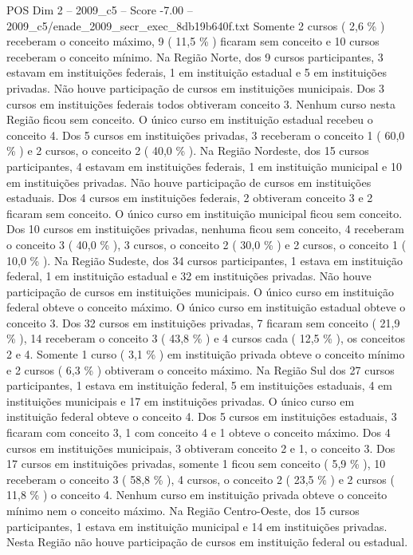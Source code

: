 \begin{textsample}{POS Dim 2 – 2009\_c5 – Score -7.00 – 2009\_c5/enade\_2009\_secr\_exec\_8db19b640f.txt}
Somente 2 cursos ( 2,6 \% ) receberam o conceito máximo, 9 ( 11,5 \% ) ficaram sem conceito e 10 cursos receberam o conceito mínimo.
Na Região Norte, dos 9 cursos participantes, 3 estavam em instituições federais, 1 em instituição estadual e 5 em instituições privadas.
Não houve participação de cursos em instituições municipais.
Dos 3 cursos em instituições federais todos obtiveram conceito 3.
Nenhum curso nesta Região ficou sem conceito.
O único curso em instituição estadual recebeu o conceito 4.
Dos 5 cursos em instituições privadas, 3 receberam o conceito 1 ( 60,0 \% ) e 2 cursos, o conceito 2 ( 40,0 \% ).
Na Região Nordeste, dos 15 cursos participantes, 4 estavam em instituições federais, 1 em instituição municipal e 10 em instituições privadas.
Não houve participação de cursos em instituições estaduais.
Dos 4 cursos em instituições federais, 2 obtiveram conceito 3 e 2 ficaram sem conceito.
O único curso em instituição municipal ficou sem conceito.
Dos 10 cursos em instituições privadas, nenhuma ficou sem conceito, 4 receberam o conceito 3 ( 40,0 \% ), 3 cursos, o conceito 2 ( 30,0 \% ) e 2 cursos, o conceito 1 ( 10,0 \% ).
Na Região Sudeste, dos 34 cursos participantes, 1 estava em instituição federal, 1 em instituição estadual e 32 em instituições privadas.
Não houve participação de cursos em instituições municipais.
O único curso em instituição federal obteve o conceito máximo.
O único curso em instituição estadual obteve o conceito 3.
Dos 32 cursos em instituições privadas, 7 ficaram sem conceito ( 21,9 \% ), 14 receberam o conceito 3 ( 43,8 \% ) e 4 cursos cada ( 12,5 \% ), os conceitos 2 e 4.
Somente 1 curso ( 3,1 \% ) em instituição privada obteve o conceito mínimo e 2 cursos ( 6,3 \% ) obtiveram o conceito máximo.
Na Região Sul dos 27 cursos participantes, 1 estava em instituição federal, 5 em instituições estaduais, 4 em instituições municipais e 17 em instituições privadas.
O único curso em instituição federal obteve o conceito 4.
Dos 5 cursos em instituições estaduais, 3 ficaram com conceito 3, 1 com conceito 4 e 1 obteve o conceito máximo.
Dos 4 cursos em instituições municipais, 3 obtiveram conceito 2 e 1, o conceito 3.
Dos 17 cursos em instituições privadas, somente 1 ficou sem conceito ( 5,9 \% ), 10 receberam o conceito 3 ( 58,8 \% ), 4 cursos, o conceito 2 ( 23,5 \% ) e 2 cursos ( 11,8 \% ) o conceito 4.
Nenhum curso em instituição privada obteve o conceito mínimo nem o conceito máximo.
Na Região Centro-Oeste, dos 15 cursos participantes, 1 estava em instituição municipal e 14 em instituições privadas.
Nesta Região não houve participação de cursos em instituição federal ou estadual.

\end{textsample}
